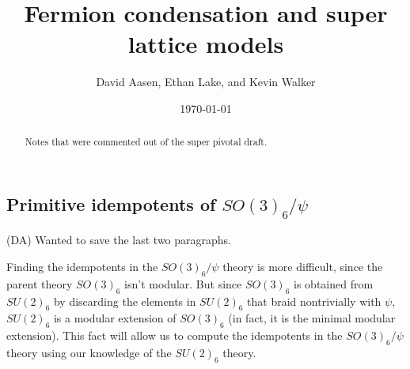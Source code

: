 \documentclass[12pt,a4paper]{article}
\newcommand{\dave}[1]{{\color{ao(english)}\footnotesize{(DA) #1}}}
\begin{document}
\title{Fermion condensation and super lattice models} %
\author{David Aasen, Ethan Lake, and Kevin Walker}

\date{\today}

\maketitle

\begin{abstract}
Notes that were commented out of the super pivotal draft.
\end{abstract}

\tableofcontents

\subsection{Primitive idempotents of $SO(3)_6/\psi$}
\dave{Wanted to save the last two paragraphs.}

Finding the idempotents in the $SO(3)_6/\psi$ theory is more difficult, since the parent theory  $SO(3)_6$ isn't modular.
But since $SO(3)_6$ is obtained from $SU(2)_6$ by discarding the elements in $SU(2)_6$ 
that braid nontrivially with $\psi$, $SU(2)_6$ is a modular extension of $SO(3)_6$ (in fact, it is the minimal modular extension). 
This fact will allow us to compute the idempotents in the $SO(3)_6/\psi$ theory using our knowledge of the $SU(2)_6$ theory. 
\end{document}
